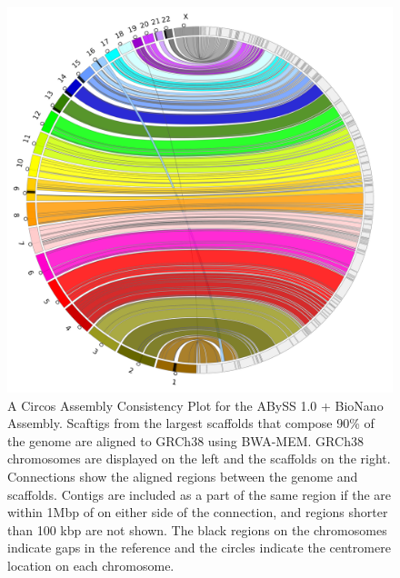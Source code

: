 \documentclass[
  12pt,
  oneside,
  openany]{book}
\begin{document}
\begin{appendices}
\begin{figure}
\hypertarget{fig:jup1}{%
\centering
\includegraphics{abyss2-appendix/abyss_bionano.png}
\caption[A Circos Assembly Consistency Plot for the ABySS 1.0 + BioNano Assembly.]{A Circos Assembly Consistency Plot for the ABySS 1.0 + BioNano Assembly. Scaftigs from the largest scaffolds that compose 90\% of the genome are aligned to GRCh38 using BWA-MEM. GRCh38 chromosomes are displayed on the left and the scaffolds on the right. Connections show the aligned regions between the genome and scaffolds. Contigs are included as a part of the same region if the are within 1Mbp of on either side of the connection, and regions shorter than 100 kbp are not shown. The black regions on the chromosomes indicate gaps in the reference and the circles indicate the centromere location on each chromosome.}\label{fig:jup1}
}
\end{figure}


\end{appendices}
\end{document}
